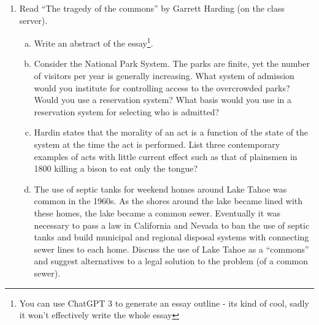 \documentclass[12pt]{article}
\begin{document}
\begin{enumerate}
\item Read ``The tragedy of the commons'' by Garrett Harding (on the class server). 
\begin{enumerate}[a)]
\item Write an abstract of the essay\footnote{You can use ChatGPT 3 to generate an essay outline - its kind of cool, sadly it won't effectively write the whole essay}.
\item Consider the National Park System.  The parks are finite, yet the number of visitors per year is generally increasing.  What system of admission would you institute for controlling access to the overcrowded parks?  Would you use a reservation system?  What basis would you use in a reservation system for selecting who is admitted?
\item Hardin states that the morality of an act is a function of the state of the system at the time the act is performed.  List three contemporary examples of acts with little current effect such as that of plainsmen in 1800 killing a bison to eat only the tongue?
\item The use of septic tanks for  weekend homes around Lake Tahoe was common in the 1960s.  As the shores around the lake became lined with these homes, the lake became a common sewer.  Eventually it was necessary to pass a law in California and Nevada to ban the use of septic tanks and build municipal and regional disposal systems with connecting sewer lines to each home.  Discuss the use of Lake Tahoe as a ``commons'' and suggest alternatives to a legal solution to the problem (of a common sewer).
\end{enumerate}

\end{enumerate}


\end{document}
